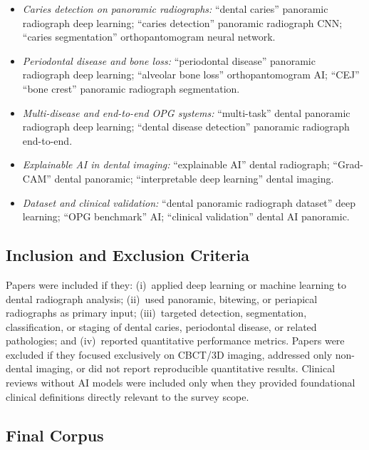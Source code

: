 \documentclass[conference]{IEEEtran}
\begin{document}
\begin{itemize}
  \item \textit{Caries detection on panoramic radiographs:}
        ``dental caries'' panoramic radiograph deep learning; ``caries
        detection'' panoramic radiograph CNN; ``caries segmentation''
        orthopantomogram neural network.

  \item \textit{Periodontal disease and bone loss:} ``periodontal
        disease'' panoramic radiograph deep learning; ``alveolar bone
        loss'' orthopantomogram AI; ``CEJ'' ``bone crest'' panoramic
        radiograph segmentation.

  \item \textit{Multi-disease and end-to-end OPG systems:}
        ``multi-task'' dental panoramic radiograph deep learning;
        ``dental disease detection'' panoramic radiograph end-to-end.

  \item \textit{Explainable AI in dental imaging:} ``explainable AI''
        dental radiograph; ``Grad-CAM'' dental panoramic;
        ``interpretable deep learning'' dental imaging.

  \item \textit{Dataset and clinical validation:} ``dental panoramic
        radiograph dataset'' deep learning; ``OPG benchmark'' AI;
        ``clinical validation'' dental AI panoramic.
\end{itemize}

\subsection{Inclusion and Exclusion Criteria}

Papers were included if they: (i)~applied deep learning or machine
learning to dental radiograph analysis; (ii)~used panoramic, bitewing,
or periapical radiographs as primary input; (iii)~targeted detection,
segmentation, classification, or staging of dental caries, periodontal
disease, or related pathologies; and (iv)~reported quantitative
performance metrics. Papers were excluded if they focused exclusively on
CBCT/3D imaging, addressed only non-dental imaging, or did not report
reproducible quantitative results. Clinical reviews without AI models
were included only when they provided foundational clinical definitions
directly relevant to the survey scope.

\subsection{Final Corpus}
\end{document}
